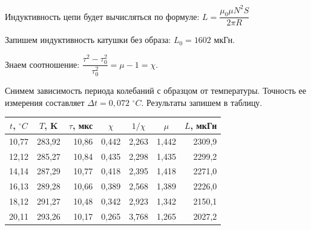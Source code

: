 \documentclass[a4paper,12pt]{article} %
\begin{document}
\vspace{5mm}
Индуктивность цепи будет вычисляться по формуле: $L = \dfrac{\mu_0 \mu N^2 S}{2\pi R}$

\vspace{3mm}
Запишем индуктивность катушки без образа: $L_0 = 1602$ мкГн.

Знаем соотношение: $\dfrac{\tau^2 - \tau_0^2}{\tau_0^2} = \mu - 1 = \chi$.

\vspace{5mm}
Снимем зависимость периода колебаний с образцом от температуры. Точность ее измерения составляет $\Delta t = 0,072$ $^\circ C$. Результаты запишем в таблицу.
	
\begin{table}[h!]
	\centering
	\begin{tabular}{|r|r|r|r|r|r|r|}
		\hline
		\multicolumn{1}{|c|}{$t$, $^\circ C$} & \multicolumn{1}{c|}{$T$, K} & \multicolumn{1}{c|}{$\tau$, мкс} & \multicolumn{1}{c|}{$\chi$} & \multicolumn{1}{c|}{$1/\chi$} & \multicolumn{1}{c|}{$\mu$} & \multicolumn{1}{c|}{$L$, мкГн} \\ \hline
		10,77                                 & 283,92                      & 10,86                            & 0,442                      & 2,263                                 & 1,442                      & 2309,9                         \\ \hline
		12,12                                 & 285,27                      & 10,84                            & 0,435                      & 2,298                                 & 1,435                      & 2299,2                         \\ \hline
		14,14                                 & 287,29                      & 10,77                            & 0,418                      & 2,395                                 & 1,418                      & 2271,0                         \\ \hline
		16,13                                 & 289,28                      & 10,66                            & 0,389                      & 2,568                                 & 1,389                      & 2226,0                         \\ \hline
		18,12                                 & 291,27                      & 10,48                            & 0,342                      & 2,923                                 & 1,342                      & 2150,1                         \\ \hline
		20,11                                 & 293,26                      & 10,17                            & 0,265                      & 3,768                                 & 1,265                      & 2027,2                         \\ \hline

\end{tabular}
\end{table}
\end{document}
